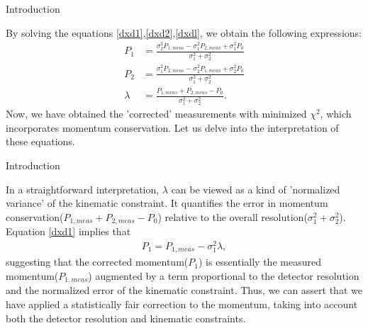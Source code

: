 \documentclass[
	xcolor=dvipsnames,
	10pt, 
	]{beamer}
\begin{document}
\begin{frame}{Introduction}
	\begin{block}{}
		By solving the equations \ref{dxd1},\ref{dxd2},\ref{dxdl}, we obtain the following expressions:
		\begin{align}
			P_1& =\frac{\sigma_2^2 P_{1,meas}-\sigma_1^2P_{2,meas}+\sigma_1^2P_0}{\sigma_1^2+\sigma_2^2}\\
			P_2& = \frac{\sigma_1^2 P_{2,meas}-\sigma_2^2P_{1,meas}+\sigma_2^2P_0}{\sigma_1^2+\sigma_2^2}\\
			\lambda&=\frac{P_{1,meas}+P_{2,meas}-P_0}{\sigma_1^2+\sigma_2^2}.
		\end{align}
			Now, we have obtained the 'corrected' measurements with minimized $\chi^2$, which incorporates momentum conservation.
			Let us delve into the interpretation of these equations.
	\end{block}
\end{frame}
\begin{frame}{Introduction}
	\begin{block}{}
			 In a straightforward interpretation, $\lambda$ can be viewed as a kind of 'normalized variance' of the kinematic constraint. It quantifies the error in momentum conservation($P_{1,meas}+P_{2,meas}-P_0$) relative to the overall resolution($\sigma_1^2+\sigma_2^2$).  Equation \eqref{dxd1} implies that 
\begin{align}
	P_{1}=P_{1,meas}-\sigma_1^2\lambda,
\end{align}
			suggesting that the corrected momentum($P_1$) is essentially the measured momentum($P_{1,meas}$) augmented by a term proportional to the detector resolution and the normalized error of the kinematic constraint. Thus, we can assert that we have applied a statistically fair correction to the momentum, taking into account both the detector resolution and kinematic constraints.
	\end{block}
\end{frame}
\end{document}
